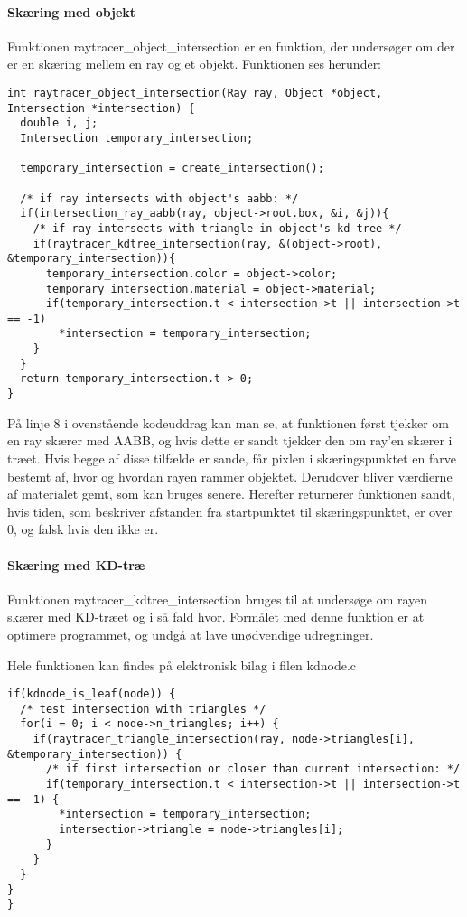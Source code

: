 \paragraph{Skæring med objekt}

Funktionen raytracer\_object\_intersection er en funktion, der undersøger om der er en skæring mellem en ray og et objekt. Funktionen ses herunder:

\begin{lstlisting}[style=Cstyle, caption=raytracer\_object\_intersection]
int raytracer_object_intersection(Ray ray, Object *object, Intersection *intersection) {
  double i, j;
  Intersection temporary_intersection;

  temporary_intersection = create_intersection();

  /* if ray intersects with object's aabb: */
  if(intersection_ray_aabb(ray, object->root.box, &i, &j)){
    /* if ray intersects with triangle in object's kd-tree */
    if(raytracer_kdtree_intersection(ray, &(object->root), &temporary_intersection)){
      temporary_intersection.color = object->color;
      temporary_intersection.material = object->material;
      if(temporary_intersection.t < intersection->t || intersection->t == -1)
        *intersection = temporary_intersection;
    }
  }
  return temporary_intersection.t > 0;
}
\end{lstlisting}

På linje 8 i ovenstående kodeuddrag kan man se, at funktionen først tjekker om en ray skærer med AABB, og hvis dette er sandt tjekker den om ray'en skærer i træet. Hvis begge af disse tilfælde er sande, får pixlen i skæringspunktet en farve bestemt af, hvor og hvordan rayen rammer objektet. Derudover bliver værdierne af materialet gemt, som kan bruges senere. Herefter returnerer funktionen sandt, hvis tiden, som beskriver afstanden fra startpunktet til skæringspunktet, er over 0, og falsk hvis den ikke er.


\paragraph{Skæring med KD-træ}

Funktionen raytracer\_kdtree\_intersection bruges til at undersøge om rayen skærer med KD-træet og i så fald hvor. Formålet med denne funktion er at optimere programmet, og undgå at lave unødvendige udregninger. 

Hele funktionen kan findes på elektronisk bilag i filen kdnode.c

\begin{lstlisting}[style=Cstyle, caption= Uddrag af funktionen raytracer\_kdtree\_intersection]
if(kdnode_is_leaf(node)) {
  /* test intersection with triangles */
  for(i = 0; i < node->n_triangles; i++) {
    if(raytracer_triangle_intersection(ray, node->triangles[i], &temporary_intersection)) {
      /* if first intersection or closer than current intersection: */
      if(temporary_intersection.t < intersection->t || intersection->t == -1) {
        *intersection = temporary_intersection;
        intersection->triangle = node->triangles[i];
      }
    }
  }
}
}
\end{lstlisting}

